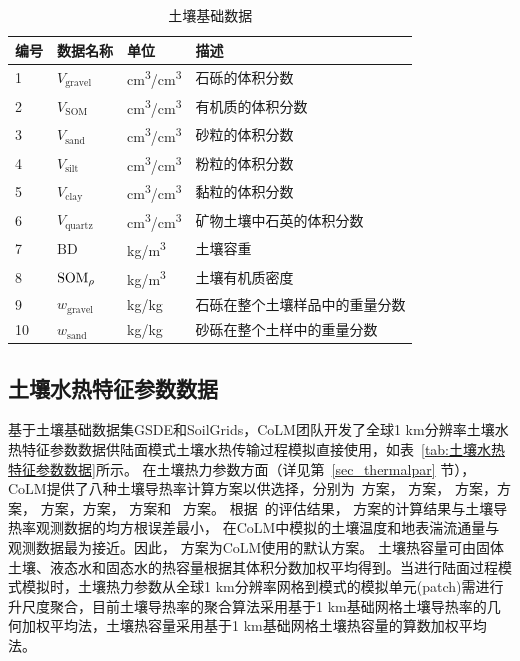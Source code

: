 \begin{table}[htbp]
  \centering
  \begin{threeparttable}
    \caption{土壤基础数据}
    \label{tab:土壤基础数据}
    \begin{tabular}{llll}
      \toprule
      编号 & 数据名称              & 单位                  & 描述                           \\
      \midrule
      1    & $V_{\mathrm{gravel}}$ & \unit{\cm^{3}/cm^{3}} & 石砾的体积分数                 \\
      2    & $V_{\mathrm{SOM}}$    & \unit{cm^3/cm^3}      & 有机质的体积分数               \\
      3    & $V_{\mathrm{sand}}$   & \unit{cm^3/cm^3}      & 砂粒的体积分数                 \\
      4    & $V_{\mathrm{silt}}$   & \unit{cm^3/cm^3}      & 粉粒的体积分数                 \\
      5    & $V_{\mathrm{clay}}$   & \unit{cm^3/cm^3}      & 黏粒的体积分数                 \\
      6    & $V_{\mathrm{quartz}}$ & \unit{ cm^3/cm^3}     & 矿物土壤中石英的体积分数       \\
      7    & ${\mathrm {BD}}$      & \unit{ kg/m^3}        & 土壤容重                       \\
      8    & ${\rm SOM}_{\rho}$    & \unit{kg/m^3}         & 土壤有机质密度                 \\
      9    & $w_{\mathrm{gravel}}$ & \unit{kg/kg}          & 石砾在整个土壤样品中的重量分数 \\
      10   & $w_{\mathrm{sand}}$   & \unit{kg/kg}          & 砂砾在整个土样中的重量分数     \\
      \bottomrule
    \end{tabular}
  \end{threeparttable}
\end{table}


\subsection{土壤水热特征参数数据}\label{土壤水热特征参数数据}
基于土壤基础数据集GSDE和SoilGrids，CoLM团队开发了全球1 km分辨率土壤水热特征参数数据供陆面模式土壤水热传输过程模拟直接使用，如表~\ref{tab:土壤水热特征参数数据}所示。
在土壤热力参数方面（详见第~\ref{sec_thermalpar} 节），CoLM提供了八种土壤导热率计算方案以供选择，分别为~\citet{farouki1981thermal}方案，\citet{Johansen1975} 方案，
\citet{cote2005} 方案，\citet{balland2005}方案，\citet{lu2007improved} 方案，\citet{Yan2019thermal}方案，\citet{tarnawski2012series} 方案和~\citet{de1963thermal} 方案。
根据~\citet{dai2019evaluation}的评估结果，\citet{balland2005} 方案的计算结果与土壤导热率观测数据的均方根误差最小，
在CoLM中模拟的土壤温度和地表湍流通量与观测数据最为接近。因此，\citet{balland2005} 方案为CoLM使用的默认方案。
土壤热容量可由固体土壤、液态水和固态水的热容量根据其体积分数加权平均得到。当进行陆面过程模式模拟时，土壤热力参数从全球1 km分辨率网格到模式的模拟单元(patch)需进行升尺度聚合，目前土壤导热率的聚合算法采用基于1 km基础网格土壤导热率的几何加权平均法，土壤热容量采用基于1 km基础网格土壤热容量的算数加权平均法。

